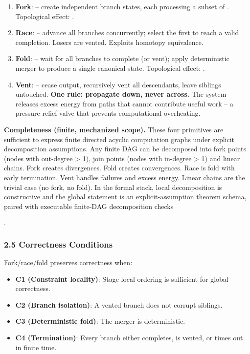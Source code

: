 \documentclass[
]{article}
\providecommand{\tightlist}{%
  \setlength{\itemsep}{0pt}\setlength{\parskip}{0pt}}
\begin{document}
\begin{enumerate}
\def\labelenumi{\arabic{enumi}.}
\tightlist
\item
  \textbf{Fork}: -- create independent branch states, each processing a
  subset of . Topological effect: .\\
\item
  \textbf{Race}: -- advance all branches concurrently; select the first
  to reach a valid completion. Losers are vented. Exploits homotopy
  equivalence.\\
\item
  \textbf{Fold}: -- wait for all branches to complete (or vent); apply
  deterministic merger to produce a single canonical state. Topological
  effect: .\\
\item
  \textbf{Vent}: -- cease output, recursively vent all descendants,
  leave siblings untouched. \textbf{One rule: propagate down, never
  across.} The system releases excess energy from paths that cannot
  contribute useful work -- a pressure relief valve that prevents
  computational overheating.
\end{enumerate}

\textbf{Completeness (finite, mechanized scope).} These four primitives
are sufficient to express finite directed acyclic computation graphs
under explicit decomposition assumptions. Any finite DAG can be
decomposed into fork points (nodes with out-degree \textgreater{} 1),
join points (nodes with in-degree \textgreater{} 1) and linear chains.
Fork creates divergences. Fold creates convergences. Race is fold with
early termination. Vent handles failures and excess energy. Linear
chains are the trivial case (no fork, no fold). In the formal stack,
local decomposition is constructive and the global statement is an
explicit-assumption theorem schema, paired with executable finite-DAG
decomposition checks

.

\subsubsection{\texorpdfstring{\textbf{2.5 Correctness
Conditions}}{2.5 Correctness Conditions}}\label{correctness-conditions}

Fork/race/fold preserves correctness when:

\begin{itemize}
\tightlist
\item
  \textbf{C1 (Constraint locality)}: Stage-local ordering is sufficient
  for global correctness.\\
\item
  \textbf{C2 (Branch isolation)}: A vented branch does not corrupt
  siblings.\\
\item
  \textbf{C3 (Deterministic fold)}: The merger is deterministic.\\
\item
  \textbf{C4 (Termination)}: Every branch either completes, is vented,
  or times out in finite time.
\end{itemize}
\end{document}
